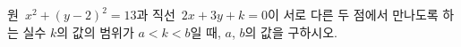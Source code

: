 원~$x^2+(y-2)^2=13$과 직선~$2x+3y+k=0$이 서로 다른 두 점에서 만나도록 하는 실수 $k$의 값의 범위가 $a<k<b$일 때, $a$, $b$의 값을 구하시오.
